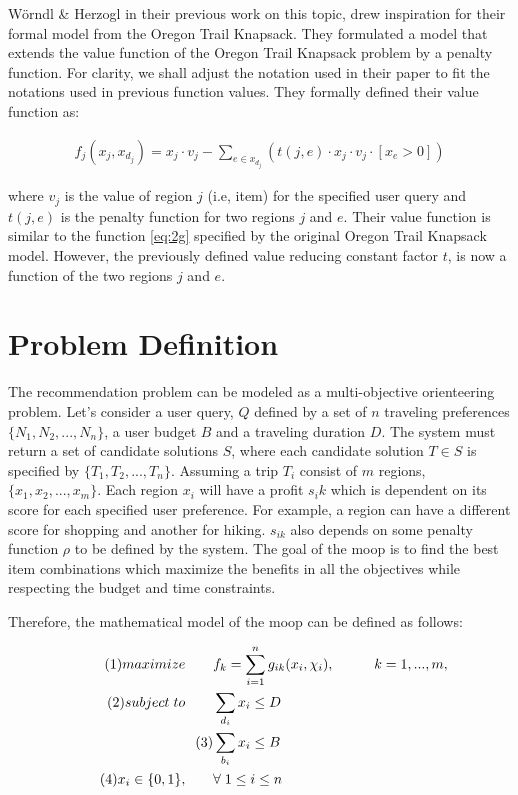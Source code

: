 Wörndl \& Herzogl\parencite{cbrecsys2014} in their previous work on this topic, drew inspiration for their formal model from the Oregon Trail Knapsack. They formulated a model that extends the value function of the Oregon Trail Knapsack problem by a penalty function. For clarity, we shall adjust the notation used in their paper to fit the notations used in previous function values. They formally defined their value function as:

\begin{gather*}
 f_j(x_j, x_{d_j}) = x_j \cdot v_j - \sum_{e \in x_{d_j}} ( t(j, e) \cdot x_j \cdot v_j \cdot [x_e > 0])
\end{gather*}

where $v_j$ is the value of region $j$ (i.e, item) for the specified user query and $t(j, e)$ is the penalty function for two regions $j$ and $e$. Their value function is similar to the function \ref{eq:2g} specified by the original Oregon Trail Knapsack model. However, the previously defined value reducing constant factor $t$, is now a function of the two regions  $j$ and $e$. 

\section{Problem Definition}
The recommendation problem can be modeled as a multi-objective orienteering problem. Let's consider a user query, $Q$ defined by a set of $n$ traveling preferences $\{N_1, N_2,...,N_n\}$, a user budget $B$ and a traveling duration $D$. The system must return a set of \glspl{candidate solution} $S$, where each \gls{candidate solution} $T \in S$ is specified by $\{T_1, T_2,...,T_n\}$. Assuming a trip $T_i$ consist of $m$ regions, $\{x_1, x_2,...,x_m\}$. Each region $x_i$ will have a profit $s_ik$ which is dependent on its score for each specified user preference. For example, a region can have a different score for shopping and another for hiking. $s_{ik}$ also depends on some penalty function $\rho$ to be defined by the system.
The goal of the \gls{moop} is to find the best item combinations which maximize the benefits in all the objectives while respecting the budget and time constraints. 

Therefore, the mathematical model of the \gls{moop} can be defined as follows:

\begin{align}
    \tag{1}maximize \qquad  &f_k = \sum_{i=1}^n g_{ik}(x_i, \chi_{i}), \hspace{1cm} k = 1,...,m,\label{eq:3a}\\
    \tag{2}subject\hspace{0.1cm} to \qquad &\sum_{d_i} x_i \leq D \label{eq:3b}\\
    \tag{3} &\sum_{b_i} x_i \leq B \label{eq:3c}\\
    \tag{4} x_i \in \{0,1\}, \qquad &\forall \hspace{0.1cm} 1 \leq i \leq n
\end{align}

